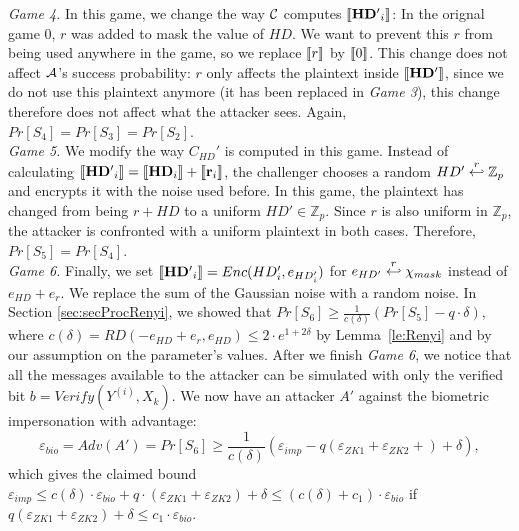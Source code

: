 \textit{Game 4.} In this game, we change the way $\mathcal{C}$ computes
$\left\llbracket\mathbf{HD'}_{i}\right\rrbracket$: In the orignal game 0, $r$ was added to mask the value
of $HD$. We want to prevent this $r$ from being used anywhere in the game, so we
replace $\left\llbracket r\right\rrbracket$ by $\left\llbracket0\right\rrbracket$. This change does not affect $\mathcal{A}$'s
success probability: $r$ only affects the plaintext inside $\left\llbracket\mathbf{HD'}\right\rrbracket$,
since we do not use this plaintext anymore (it has been replaced in \textit{Game
  3}), this
change therefore does not affect what the attacker sees. Again, $Pr[S_4] = Pr[S_3] = Pr[S_2]$.\\


\textit{Game 5.} We modify the way $C_{HD}'$ is computed in this game. Instead
of calculating
$\left\llbracket\mathbf{HD'}_{i}\right\rrbracket = \left\llbracket\mathbf{HD}_{i}\right\rrbracket + \left\llbracket\mathbf{r}_{i}\right\rrbracket$, the
challenger chooses a random $HD' \stackrel{r}{\hookleftarrow} \mathbb{Z}_p$ and encrypts it
with the noise used before. In this game, the plaintext has changed from being
$r + HD$ to a uniform $HD' \in \mathbb{Z}_p$.  Since $r$ is also uniform in
$\mathbb{Z}_p$, the attacker is confronted with a uniform
plaintext in both cases. Therefore, $Pr[S_5] = Pr[S_4]$.\\
\textit{Game 6.} Finally, we set $\left\llbracket\mathbf{HD'}_{i}\right\rrbracket = Enc(HD'_{i}, e_{HD'_{i}})$ for
$e_{HD'} \stackrel{r}{\hookleftarrow} \chi_{mask}$ instead of $e_{HD} + e_{r}$. We replace
the sum of the Gaussian noise with a random noise. In Section \ref{sec:secProcRenyi},
we showed that $Pr[S_6] \geq \frac{1}{c(\delta)}(Pr[S_5]-q \cdot \delta)$, where
$c(\delta) = RD(-e_{HD} + e_{r}, e_{HD}) \leq 2 \cdot e^{1+2\delta}$ by
Lemma~\ref{le:Renyi} and by our assumption on the parameter's values. After we
finish \textit{Game 6}, we notice that all the messages available to the
attacker can be simulated with only the verified bit $b = Verify(Y^{(i)},
X_k)$. We now have an attacker $A'$ against the biometric impersonation with
advantage:
\[
\varepsilon_{bio} = Adv(A') = Pr[S_6] \geq \frac{1}{c(\delta)}(\varepsilon_{imp} - q(\varepsilon_{ZK1}+\varepsilon_{ZK2} +) + \delta),
\]
which gives the claimed bound $\varepsilon_{imp} \leq c(\delta) \cdot \varepsilon_{bio} + q \cdot (\varepsilon_{ZK1}+\varepsilon_{ZK2}) + \delta \leq (c(\delta)+c_1) \cdot \varepsilon_{bio}$ if $q(\varepsilon_{ZK1}+\varepsilon_{ZK2}) + \delta \leq c_1 \cdot \varepsilon_{bio}$.


